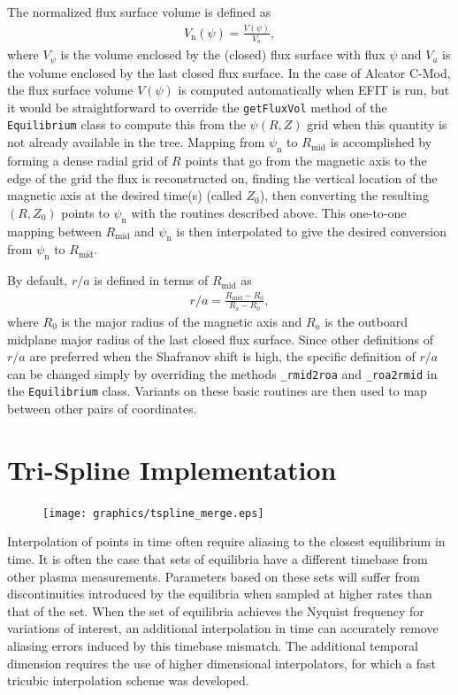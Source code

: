 \documentclass[12pt,floatfix,showpacs]{revtex4-1}
\begin{document}
The normalized flux surface volume is defined as
\begin{gather}
	V_{\text{n}}(\psi) = \frac{V(\psi)}{V_{a}},
\end{gather}
where $V_{\psi}$ is the volume enclosed by the (closed) flux surface with flux $\psi$ and $V_{a}$ is the volume enclosed by the last closed flux surface.
In the case of Alcator C-Mod, the flux surface volume $V(\psi)$ is computed automatically when EFIT is run, but it would be straightforward to override the \verb|getFluxVol| method of the \verb|Equilibrium| class to compute this from the $\psi(R, Z)$ grid when this quantity is not already available in the tree.
Mapping from $\psi_{\text{n}}$ to $R_{\text{mid}}$ is accomplished by forming a dense radial grid of $R$ points that go from the magnetic axis to the edge of the grid the flux is reconstructed on, finding the vertical location of the magnetic axis at the desired time(s) (called $Z_{0}$), then converting the resulting $(R, Z_{0})$ points to $\psi_{\text{n}}$ with the routines described above.
This one-to-one mapping between $R_{\text{mid}}$ and $\psi_{\text{n}}$ is then interpolated to give the desired conversion from $\psi_{\text{n}}$ to $R_{\text{mid}}$.

By default, $r/a$ is defined in terms of $R_{\text{mid}}$ as
\begin{gather}
	r/a = \frac{R_{\text{mid}} - R_{0}}{R_{a} - R_{0}},
\end{gather}
where $R_{0}$ is the major radius of the magnetic axis and $R_{a}$ is the outboard midplane major radius of the last closed flux surface.
Since other definitions of $r/a$ are preferred when the Shafranov shift is high, the specific definition of $r/a$ can be changed simply by overriding the methods \verb|_rmid2roa| and \verb|_roa2rmid| in the \verb|Equilibrium| class.
Variants on these basic routines are then used to map between other pairs of coordinates.

\section{Tri-Spline Implementation}\label{sec:trispline}

\begin{figure}[ht]
 \texttt{[image: graphics/tspline\_merge.eps]}
 \caption{}
 \label{fig:tspline}
\end{figure}

Interpolation of points in time often require aliasing to the closest equilibrium in time. It is often the case that sets of equilibria have a different timebase from other plasma measurements. Parameters based on these sets will suffer from discontinuities introduced by the equilibria when sampled at higher rates than that of the set.  When the set of equilibria achieves the Nyquist frequency for variations of interest, an additional interpolation in time can accurately remove aliasing errors induced by this timebase mismatch. The additional temporal dimension requires the use of higher dimensional interpolators, for which a fast tricubic interpolation scheme was developed. 
\end{document}

